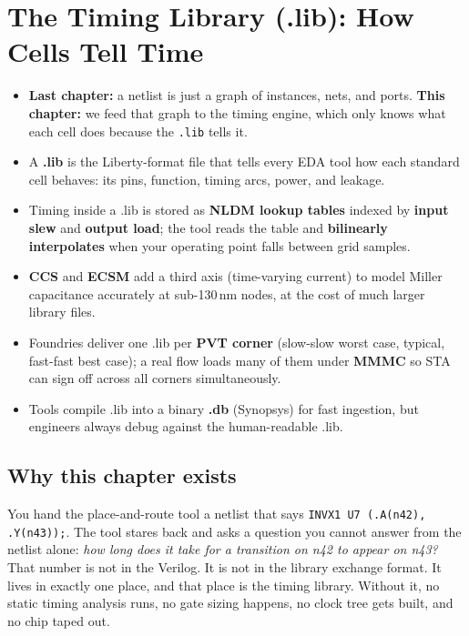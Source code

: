 \chapter{The Timing Library (.lib): How Cells Tell Time}

\begin{tldr}
\begin{itemize}[leftmargin=*]
  \item \textbf{Last chapter:} a netlist is just a graph of instances, nets, and ports. \textbf{This chapter:} we feed that graph to the timing engine, which only knows what each cell does because the \texttt{.lib} tells it.
  \item A \textbf{.lib} is the Liberty-format file that tells every EDA tool how each standard cell behaves: its pins, function, timing arcs, power, and leakage.
  \item Timing inside a .lib is stored as \textbf{NLDM lookup tables} indexed by \textbf{input slew} and \textbf{output load}; the tool reads the table and \textbf{bilinearly interpolates} when your operating point falls between grid samples.
  \item \textbf{CCS} and \textbf{ECSM} add a third axis (time-varying current) to model Miller capacitance accurately at sub-130\,nm nodes, at the cost of much larger library files.
  \item Foundries deliver one .lib per \textbf{PVT corner} (slow-slow worst case, typical, fast-fast best case); a real flow loads many of them under \textbf{MMMC} so STA can sign off across all corners simultaneously.
  \item Tools compile .lib into a binary \textbf{.db} (Synopsys) for fast ingestion, but engineers always debug against the human-readable .lib.
\end{itemize}
\end{tldr}

\section*{Why this chapter exists}

You hand the place-and-route tool a netlist that says \texttt{INVX1 U7 (.A(n42), .Y(n43));}. The tool stares back and asks a question you cannot answer from the netlist alone: \emph{how long does it take for a transition on n42 to appear on n43?} That number is not in the Verilog. It is not in the library exchange format. It lives in exactly one place, and that place is the timing library. Without it, no static timing analysis runs, no gate sizing happens, no clock tree gets built, and no chip taped out.

